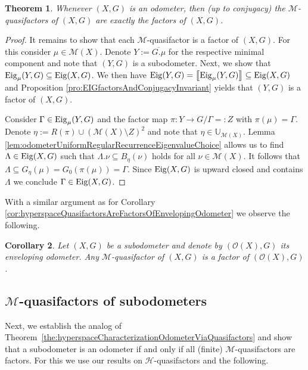 \documentclass[12pt, reqno]{amsart}
\newtheorem{theorem}{Theorem}[section]
\newtheorem{corollary}[theorem]{Corollary}
\theoremstyle{definition}
\theoremstyle{remark}
\numberwithin{equation}{section}
\theoremstyle{theorem}
\theoremstyle{remark}
\def\Eig{{\rm Eig}}
\newcommand{\envelopingOdometer}[1]{\mathcal{O}(#1)}
\def\hyper{{\mathcal{H}}}
\newcommand{\eigenhull}[1]{\left\llbracket #1 \right\rrbracket}
\begin{document}
\begin{theorem}
\label{the:forOdometersComponentsMXfactor}
    Whenever $(X,G)$ is an odometer, then (up to conjugacy) the $\mathcal{M}$-quasifactors of $(X,G)$ are exactly the factors of $(X,G)$. 
\end{theorem}
\begin{proof}
    It remains to show that each $\mathcal{M}$-quasifactor is a factor of $(X,G)$. 
    For this consider $\mu\in \mathcal{M}(X)$. 
    Denote $Y:=\overline{G.\mu}$ for the respective minimal component and note that $(Y,G)$ is a subodometer. 
    Next, we show that $\Eig_\mu(Y,G)\subseteq \Eig(X,G)$. 
    We then have $\Eig(Y,G)=\eigenhull{\Eig_\mu(Y,G)}\subseteq \Eig(X,G)$ and Proposition \ref{pro:EIGfactorsAndConjugacyInvariant} yields that $(Y,G)$ is a factor of $(X,G)$. 
    
    Consider $\Gamma\in \Eig_\mu(Y,G)$ and the factor map $\pi\colon Y\to G/\Gamma=:Z$ with $\pi(\mu)=\Gamma$. 
    Denote
    $\eta:=R(\pi)\cup (\mathcal{M}(X)\setminus Z)^2$
    and note that $\eta\in \mathbb{U}_{\mathcal{M}(X)}$. 
    Lemma \ref{lem:odometerUniformRegularRecurrenceEigenvalueChoice}
    allows us to find $\Lambda\in \Eig(X,G)$ such that $\Lambda.\nu \subseteq B_\eta(\nu)$ holds for all $\nu\in \mathcal{M}(X)$. 
    It follows that $\Lambda\subseteq G_\eta(\mu)=G_0(\pi(\mu))=\Gamma$. 
    Since $\Eig(X,G)$ is upward closed and contains $\Lambda$ we conclude $\Gamma\in \Eig(X,G)$. 
\end{proof}

With a similar argument as for Corollary \ref{cor:hyperspaceQuasifactorsAreFactorsOfEnvelopingOdometer} we observe the following. 

\begin{corollary}
\label{cor:measureQuasifactorsAreFactorsOfEnvelopingOdometer}
    Let $(X,G)$ be a subodometer and denote by $(\envelopingOdometer{X},G)$ its enveloping odometer. Any $\mathcal{M}$-quasifactor of $(X,G)$ is a factor of $(\envelopingOdometer{X},G)$.  
\end{corollary}



\subsection{$\mathcal{M}$-quasifactors of subodometers}
\label{subsec:inducedDynamicsOnTheRegularBorelProbabilityMeasures_MQuasifactorsOfSubodometers}
Next, we establish the analog of Theorem~\ref{the:hyperspaceCharacterizationOdometerViaQuasifactors} and show that a subodometer is an odometer if and only if all (finite) $\mathcal{M}$-quasifactors are factors. 
For this we use our results on $\hyper$-quasifactors and the following. 
\end{document}
